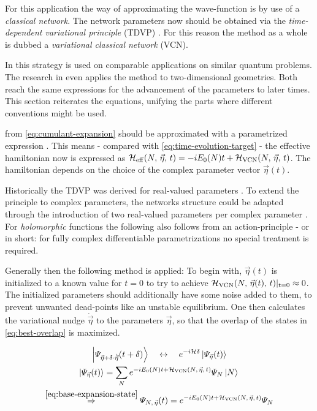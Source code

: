 For this application the way of approximating the wave-function is by use of a \emph{classical network}. 
The network parameters now should be obtained via the \emph{time-dependent variational principle} (TDVP) \cite{originalDerivationTimeDependendVariationalPrinciple}.
For this reason the method as a whole is dubbed a \emph{variational classical network} (VCN).

In \cite{variationalClassicalNetworksPaper} this strategy is used on comparable applications on similar quantum problems.
The research in \cite{probabilitySamplingRequirementVCN} even applies the method to two-dimensional geometries.
Both reach the same expressions for the advancement of the parameters to later times.
This section reiterates the equations, unifying the parts where different conventions might be used.

\HNOft from \autoref{eq:cumulant-expansion} should be approximated with a parametrized expression \HvcnOft{\vec{\eta}}.
This means - compared with \autoref{eq:time-evolution-target} - the effective hamiltonian now is expressed as $\HeffOft[N,\,\vec{\eta}] = -i E_0(N) t + \HvcnOft{\vec{\eta}}$.
The hamiltonian depends on the choice of the complex parameter vector $\vec{\eta}(t)$.

Historically the TDVP was derived for real-valued parameters \cite{originalDerivationTimeDependendVariationalPrinciple}.
To extend the principle to complex parameters, the networks structure could be adapted through the introduction of two real-valued parameters per complex parameter \cite{TDVPcomplexPrefactors}.
For \emph{holomorphic} functions the following also follows from an action-principle \cite{probabilitySamplingRequirementVCN} - or in short: for fully complex differentiable \cite{complexDifferentiation} parametrizations no special treatment is required.

Generally then the following method is applied: To begin with, $\vec{\eta}(t)$ is initialized to a known value for $t=0$ to try to achieve $\HvcnOft{\vec{\eta}(t)} \vert_{t=0} \approx 0$.
The initialized parameters should additionally have some noise added to them, to prevent unwanted dead-points like an unstable equilibrium.
One then calculates the variational nudge $\dot{\vec{\eta}}$ to the parameters $\vec{\eta}$, so that the overlap of the states in \autoref{eq:best-overlap} is maximized.

\begin{equation}
    \label{eq:best-overlap}
    \begin{gathered}
        \ketpsiEta{\vec{\eta} + \delta \cdot \dot{\vec{\eta}}}{t + \delta} \quad\leftrightarrow\quad e^{-i \hamiltonian \delta} \ketpsiEta{\vec{\eta}}{t}
        \\
        \ketpsiEta{\vec{\eta}}{t} = \lsum[N] e^{-i E_0(N) t + \HvcnOft{\vec{\eta}}} \psiN \ketN{}
        \\
        \stackrel{\ref{eq:base-expansion-state}}{\Rightarrow} \psiEta{N,\,\vec{\eta}}{t} = e^{-i E_0(N) t + \HvcnOft{\vec{\eta}}} \psiN
    \end{gathered}
\end{equation}

